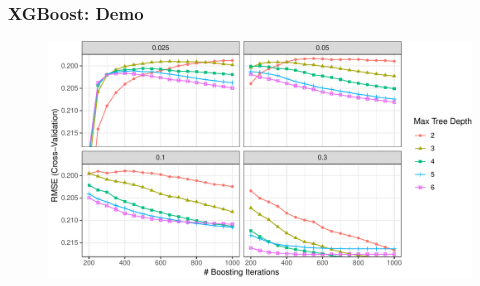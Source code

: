 \documentclass[
  shownotes,
  xcolor={svgnames},
  hyperref={colorlinks,citecolor=DarkBlue,linkcolor=DarkRed,urlcolor=DarkBlue}
  , aspectratio=169]{beamer}
\begin{document}
\begin{frame}[fragile]
\frametitle{XGBoost: Demo}



  \begin{figure}[H] \centering
            \captionsetup{justification=centering}
              \includegraphics[scale=0.6]{figures/unnamed-chunk-4-1.pdf}
              
 \end{figure}

\end{frame}


\end{document}

